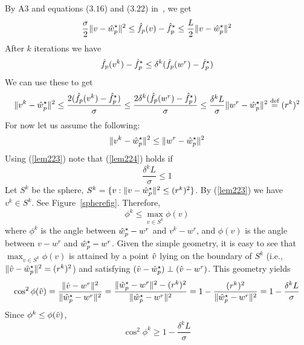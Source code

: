 \documentclass[twoside, 11pt]{article}
\begin{document}
By A3 and equations ($3.16$) and ($3.22$) in~\cite{smola2008}, we get
\begin{equation}
\frac{\sigma}{2} \|v-\hat{w}_p^\star\|^2 \le \hat{f}_p(v) - \hat{f}_p^\star \le \frac{L}{2} \|v-\hat{w}_p^\star\|^2
\label{lem221}
\end{equation}
After $k$ iterations we have
\begin{equation}
\hat{f}_p(v^k) - \hat{f}_p^\star \le \delta^k (\hat{f}_p(w^r) - \hat{f}_p^\star)
\label{lem222}
\end{equation}
We can use these to get
\begin{eqnarray}
\|v^k-\hat{w}_p^\star\|^2 \le \frac{2(\hat{f}_p(v^k)-\hat{f}_p^\star)}{\sigma}
                        \le \frac{2\delta^k (\hat{f}_p(w^r)-\hat{f}_p^\star)}{\sigma}
                        \le \frac{\delta^kL}{\sigma} \|w^r-\hat{w}_p^\star\|^2 \stackrel{\text{def}}{=} (r^k)^2
\label{lem223}
\end{eqnarray}
For now let us assume the following:
\begin{equation}
\|v^k-\hat{w}_p^\star\|^2 \le \|w^r-\hat{w}_p^\star\|^2
\label{lem224}
\end{equation}
Using (\ref{lem223}) note that (\ref{lem224}) holds if
\begin{equation}
\frac{\delta^kL}{\sigma} \le 1
\label{lem225}
\end{equation}
Let $S^k$ be the sphere, $S^k = \{ v : \|v-\hat{w}_p^\star\|^2 \le (r^k)^2 \}$. By (\ref{lem223})
we have $v^k\in S^k$. See Figure~\ref{spherefig}. Therefore,
\begin{equation}
\phi^k \le \max_{v\in S^k} \phi(v)
\label{lem226}
\end{equation}
where $\phi^k$ is the angle between $\hat{w}_p^\star-w^r$ and $v^k-w^r$, and $\phi(v)$ is the angle between $v-w^r$ and $\hat{w}_p^\star-w^r$. Given the simple geometry, it is easy to see that $\max_{v\in S^k} \phi(v)$ is attained by a point $\hat{v}$ lying on the boundary of $S^k$ (i.e., $\|\hat{v}-\hat{w}_p^\star\|^2 = (r^k)^2$) and satisfying $(\hat{v}-\hat{w}_p^\star)\perp (\hat{v}-w^r)$. This geometry yields
\begin{eqnarray}
\cos^2 \phi(\hat{v}) = \frac{\|\hat{v}-w^r\|^2}{\|\hat{w}_p^\star-w^r\|^2}
                   = \frac{\|\hat{w}_p^\star-w^r\|^2-(r^k)^2}{\|\hat{w}_p^\star-w^r\|^2}
                   = 1-\frac{(r^k)^2}{\|\hat{w}_p^\star-w^r\|^2} = 1-\frac{\delta^kL}{\sigma}
\label{lem227}
\end{eqnarray}
Since $\phi^k\le \phi(\hat{v})$,
\begin{equation}
\cos^2 \phi^k \ge 1-\frac{\delta^kL}{\sigma}
\label{lem228}
\end{equation}
\end{document}

